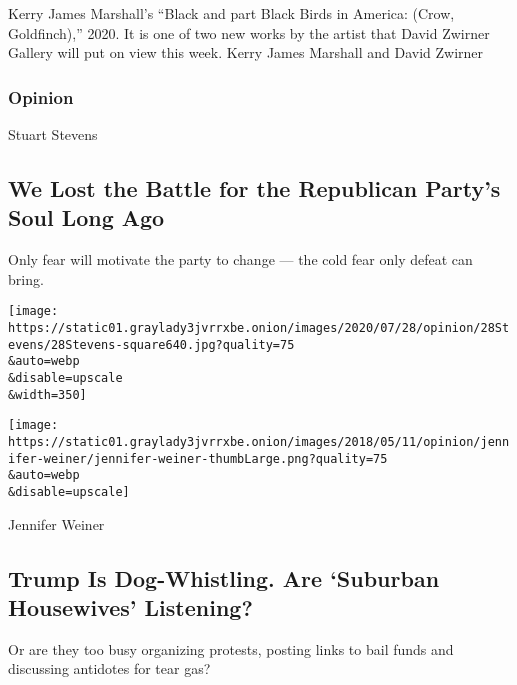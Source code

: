 Kerry James Marshall's ``Black and part Black Birds in America: (Crow,
Goldfinch),'' 2020. It is one of two new works by the artist that David
Zwirner Gallery will put on view this week. Kerry James Marshall and
David Zwirner

\href{https://www.nytimes3xbfgragh.onion/section/opinion?pagetype=Homepage\&action=click\&module=Opinion}{}

\hypertarget{opinion}{%
\subsubsection{Opinion}\label{opinion}}

\href{/2020/07/29/opinion/trump-republican-party-racism.html}{}

Stuart Stevens

\hypertarget{we-lost-the-battle-for-the-republican-partys-soul-long-ago}{%
\subsection{We Lost the Battle for the Republican Party's Soul Long
Ago}\label{we-lost-the-battle-for-the-republican-partys-soul-long-ago}}

Only fear will motivate the party to change --- the cold fear only
defeat can bring.

\href{/2020/07/29/opinion/trump-republican-party-racism.html}{}

\texttt{[image: https://static01.graylady3jvrrxbe.onion/images/2020/07/28/opinion/28Stevens/28Stevens-square640.jpg?quality=75\\\&auto=webp\\\&disable=upscale\\\&width=350]}

\href{/2020/07/28/opinion/trump-white-women.html}{}

\texttt{[image: https://static01.graylady3jvrrxbe.onion/images/2018/05/11/opinion/jennifer-weiner/jennifer-weiner-thumbLarge.png?quality=75\\\&auto=webp\\\&disable=upscale]}

Jennifer Weiner

\hypertarget{trump-is-dog-whistling-are-suburban-housewives-listening}{%
\subsection{Trump Is Dog-Whistling. Are `Suburban Housewives'
Listening?}\label{trump-is-dog-whistling-are-suburban-housewives-listening}}

Or are they too busy organizing protests, posting links to bail funds
and discussing antidotes for tear gas?

